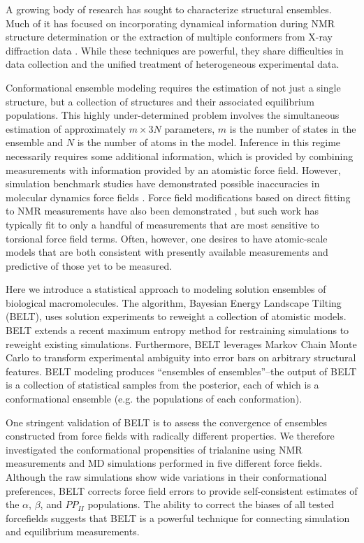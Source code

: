\documentclass[11pt,titlepage]{article}
\begin{document}
A growing body of research has sought to characterize structural ensembles.  Much of it has focused on incorporating dynamical information during NMR structure determination  \citep{lindorff2005simultaneous, lange2008recognition} or the extraction of multiple conformers from X-ray diffraction data  \citep{depristo2004heterogeneity, lang2010automated}.  While these techniques are powerful, they share difficulties in data collection and the unified treatment of heterogeneous experimental data.  

Conformational ensemble modeling requires the estimation of not just a single structure, but a collection of structures and their associated equilibrium populations.  This highly under-determined problem involves the simultaneous estimation of approximately $m\times 3N$ parameters, $m$ is the number of states in the ensemble and $N$ is the number of atoms in the model.  Inference in this regime necessarily requires some additional information, which is provided by combining measurements with information provided by an atomistic force field.  However, simulation benchmark studies have demonstrated possible inaccuracies in molecular dynamics force fields \citep{best2008, lindorff2012systematic, beauchamp2012protein}.  Force field modifications based on direct fitting to NMR measurements have also been demonstrated \cite{li2011iterative, best2012optimization, nerenberg2011}, but such work has typically fit to only a handful of measurements that are most sensitive to torsional force field terms.  Often, however, one desires to have atomic-scale models that are both consistent with presently available measurements and predictive of those yet to be measured.  

Here we introduce a statistical approach to modeling solution ensembles of biological macromolecules.  The algorithm, Bayesian Energy Landscape Tilting (BELT), uses solution experiments to reweight a collection of atomistic models.  BELT extends a recent maximum entropy method for restraining simulations  \citep{chodera2012} to reweight existing simulations.  Furthermore, BELT leverages Markov Chain Monte Carlo to transform experimental ambiguity into error bars on arbitrary structural features.  BELT modeling produces ``ensembles of ensembles''--the output of BELT is a collection of statistical samples from the posterior, each of which is a conformational ensemble (e.g. the populations of each conformation).  

One stringent validation of BELT is to assess the convergence of ensembles constructed from force fields with radically different properties.  We therefore investigated the conformational propensities of trialanine using NMR measurements \citep{Graf2007} and MD simulations performed in five different force fields.  Although the raw simulations show wide variations in their conformational preferences, BELT corrects force field errors to provide self-consistent estimates of the $\alpha$, $\beta$, and $PP_{II}$ populations.  The ability to correct the biases of all tested forcefields suggests that BELT is a powerful technique for connecting simulation and equilibrium measurements.  
\end{document}
